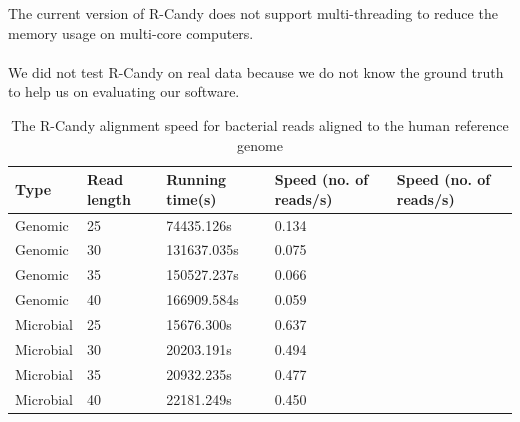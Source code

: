 \documentclass[11pt,a4paper]{report}
\begin{document}
The current version of R-Candy does not support multi-threading to reduce the 
memory usage on multi-core computers.\\\\
We did not test R-Candy on real data because we do not know the ground truth
to help us on evaluating our software.\\
\begin{table}[H]
  \begin{tabular}{ |  p{2cm} | p{2cm} | p{3cm} | p{3cm} | p{3cm} |}
    \hline
  	\textbf{Type} & \textbf{Read length } &\textbf{Running time(s) } 
  	&\textbf{Speed \hspace{35pt}(no. of reads/s)} & \textbf{Speed \hspace{35pt}(no. of reads/s)}\\ \hline
  	  
 	  Genomic    & 25  & 74435.126s  & 0.134 \\ \hline
      Genomic    & 30  & 131637.035s & 0.075 \\ \hline
 	  Genomic	 & 35  & 150527.237s & 0.066 \\ \hline
 	  Genomic	 & 40  & 166909.584s & 0.059 \\ \hline
 	  Microbial  & 25  & 15676.300s  & 0.637 \\ \hline
      Microbial  & 30  & 20203.191s  & 0.494 \\ \hline
 	  Microbial  & 35  & 20932.235s  & 0.477 \\ \hline
 	  Microbial  & 40  & 22181.249s  & 0.450 \\ \hline
 	  
   \end{tabular}
\caption{The R-Candy alignment speed for bacterial reads aligned to the human reference genome}
\label{speed-SG}
\end{table}
\end{document}
